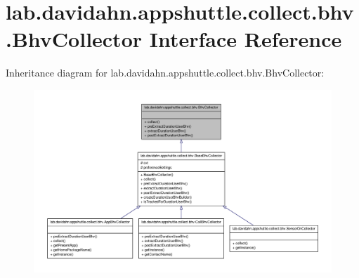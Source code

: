 \hypertarget{interfacelab_1_1davidahn_1_1appshuttle_1_1collect_1_1bhv_1_1_bhv_collector}{\section{lab.\-davidahn.\-appshuttle.\-collect.\-bhv.\-Bhv\-Collector \-Interface \-Reference}
\label{interfacelab_1_1davidahn_1_1appshuttle_1_1collect_1_1bhv_1_1_bhv_collector}
}


\-Inheritance diagram for lab.\-davidahn.\-appshuttle.\-collect.\-bhv.\-Bhv\-Collector\-:
\nopagebreak
\begin{figure}[H]
\begin{center}
\leavevmode
\includegraphics[width=350pt]{interfacelab_1_1davidahn_1_1appshuttle_1_1collect_1_1bhv_1_1_bhv_collector__inherit__graph}
\end{center}
\end{figure}

